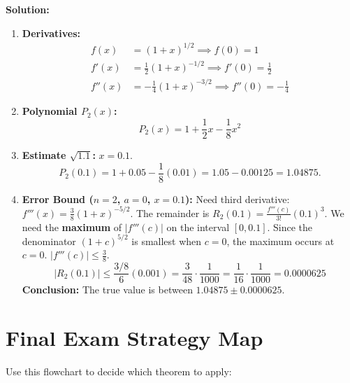 \documentclass[11pt]{article}
\begin{document}
\textbf{Solution:}
\begin{enumerate}
    \item \textbf{Derivatives:}
    \begin{align*}
        f(x) &= (1+x)^{1/2} \implies f(0)=1 \\
        f'(x) &= \frac{1}{2}(1+x)^{-1/2} \implies f'(0)=\frac{1}{2} \\
        f''(x) &= -\frac{1}{4}(1+x)^{-3/2} \implies f''(0)=-\frac{1}{4}
    \end{align*}
    \item \textbf{Polynomial $P_2(x)$:}
    \[
    P_2(x) = 1 + \frac{1}{2}x - \frac{1}{8}x^2
    \]
    \item \textbf{Estimate $\sqrt{1.1}$:} $x = 0.1$.
    \[
    P_2(0.1) = 1 + 0.05 - \frac{1}{8}(0.01) = 1.05 - 0.00125 = 1.04875.
    \]
    \item \textbf{Error Bound ($n=2$, $a=0$, $x=0.1$):}
    Need third derivative: $f'''(x) = \frac{3}{8}(1+x)^{-5/2}$.
    The remainder is $R_2(0.1) = \frac{f'''(c)}{3!}(0.1)^3$.
    We need the \textbf{maximum} of $|f'''(c)|$ on the interval $[0, 0.1]$.
    Since the denominator $(1+c)^{5/2}$ is smallest when $c=0$, the maximum occurs at $c=0$.
    $|f'''(c)| \le \frac{3}{8}$.
    \[
    |R_2(0.1)| \le \frac{3/8}{6} (0.001) = \frac{3}{48} \cdot \frac{1}{1000} = \frac{1}{16} \cdot \frac{1}{1000} = 0.0000625
    \]
    \textbf{Conclusion:} The true value is between $1.04875 \pm 0.0000625$.
\end{enumerate}

\section{Final Exam Strategy Map}
Use this flowchart to decide which theorem to apply:
\end{document}

